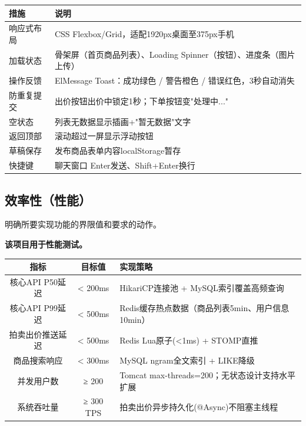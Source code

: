 \documentclass[12pt,a4paper]{ctexart}
\numberwithin{figure}{section}
\numberwithin{table}{section}
\begin{document}
\begin{center}
\renewcommand{\arraystretch}{1.3}
\begin{tabular}{|p{4cm}|p{10cm}|}
\hline
\rowcolor{tableheader}
\textbf{措施} & \textbf{说明} \\
\hline
响应式布局 & CSS Flexbox/Grid，适配1920px桌面至375px手机 \\
\hline
加载状态 & 骨架屏（首页商品列表）、Loading Spinner（按钮）、进度条（图片上传） \\
\hline
操作反馈 & ElMessage Toast：成功绿色 / 警告橙色 / 错误红色，3秒自动消失 \\
\hline
防重复提交 & 出价按钮出价中锁定1秒；下单按钮变"处理中..." \\
\hline
空状态 & 列表无数据显示插画+"暂无数据"文字 \\
\hline
返回顶部 & 滚动超过一屏显示浮动按钮 \\
\hline
草稿保存 & 发布商品表单内容localStorage暂存 \\
\hline
快捷键 & 聊天窗口 Enter发送、Shift+Enter换行 \\
\hline
\end{tabular}
\end{center}

\subsection{效率性（性能）}

明确所要实现功能的界限值和要求的动作。

\textbf{该项目用于性能测试。}

\begin{center}
\renewcommand{\arraystretch}{1.3}
\begin{tabular}{|c|c|p{7cm}|}
\hline
\rowcolor{tableheader}
\textbf{指标} & \textbf{目标值} & \textbf{实现策略} \\
\hline
核心API P50延迟 & < 200ms & HikariCP连接池 + MySQL索引覆盖高频查询 \\
\hline
核心API P99延迟 & < 500ms & Redis缓存热点数据（商品列表5min、用户信息10min） \\
\hline
拍卖出价推送延迟 & < 500ms & Redis Lua原子(<1ms) + STOMP直推 \\
\hline
商品搜索响应 & < 300ms & MySQL ngram全文索引 + LIKE降级 \\
\hline
并发用户数 & ≥ 200 & Tomcat max-threads=200；无状态设计支持水平扩展 \\
\hline
系统吞吐量 & ≥ 300 TPS & 拍卖出价异步持久化(@Async)不阻塞主线程 \\
\hline
\end{tabular}
\end{center}
\end{document}
